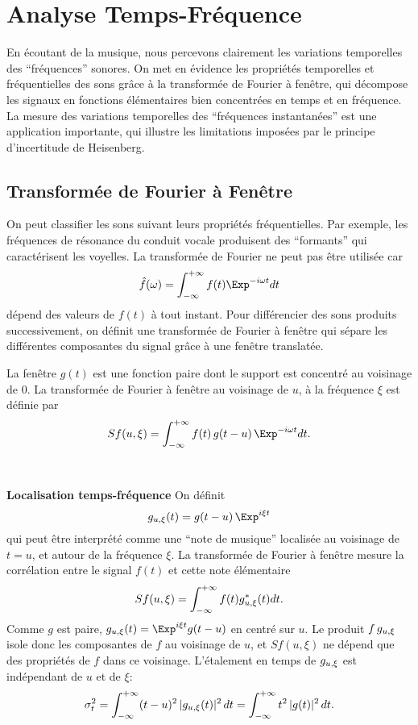 \chapter{Analyse Temps-Fr\'equence}
\label{chap-ana-temp-fre}

En \'{e}coutant de la musique, 
nous percevons clairement les variations temporelles
des ``fr\'{e}quences'' sonores. 
On met en \'{e}vidence les propri\'{e}t\'{e}s temporelles
et fr\'equentielles
des sons gr\^{a}ce \`{a} 
la transform\'{e}e de Fourier \`a fen\^etre,
qui d\'{e}compose les 
signaux en fonctions \'{e}l\'{e}mentaires bien concentr\'{e}es en 
temps et en fr\'{e}quence. La 
mesure des variations temporelles des
``fr\'{e}quences instantan\'{e}es'' est une application
importante, qui illustre les limitations impos\'ees par
le principe d'incertitude de Heisenberg.

\section{Transform\'ee de Fourier \`a Fen\^etre}
\label{temp-fre-se}

On peut classifier les sons suivant leurs propri\'et\'es 
fr\'equentielles. 
Par exemple, les fr\'equences de r\'esonance du conduit
vocale produisent des ``formants'' qui caract\'erisent les voyelles.
La transform\'ee de Fourier ne peut pas \^etre utilis\'ee car
\[
\hat f (\om) = \int_{-\infty}^{+\infty} f(t) \Exp^{-i\om t} dt
\]
d\'epend des valeurs de $f(t)$ \`a tout instant. Pour diff\'erencier
des sons produits successivement, on d\'efinit une  
transform\'ee de Fourier \`a fen\^etre qui 
s\'epare les diff\'erentes
composantes du signal gr\^ace \`a une fen\^etre translat\'ee.

La fen\^etre $g(t)$
est une fonction paire dont le support est concentr\'e au
voisinage de $0$. 
La transform\'ee de Fourier \`a fen\^etre
au voisinage de $u$, \`a la fr\'equence $\xi$ est d\'efinie par
\[
Sf(u,\xi) = \int_{-\infty}^{+\infty} f(t) \,g(t-u) \,\Exp^{-i\om t} dt .
\]
\\
\\
{\bf Localisation temps-fr\'equence}
On d\'efinit
\[
g_\uxi (t) = g(t-u) \,\Exp^{i\xi t}
\] 
qui peut \^etre interpr\'et\'e comme une ``note de musique''
localis\'ee au voisinage de $t =u$, et autour de 
la fr\'equence $\xi$.
La transform\'ee de Fourier \`a fen\^etre mesure la corr\'elation
entre le signal $f(t)$ et cette note \'el\'ementaire
\begin{equation}
\label{temp-fre-at}
Sf(u,\xi) = \int_{-\infty}^{+\infty} f(t) g_{u,\xi}^*(t) dt .
\end{equation}
Comme $g$ est paire, $g_{u,\xi} (t ) = \Exp^{i \xi t}	g(t-u)$ en 
centr\'{e} sur $u$. 
Le produit $f\, g_{u,\xi}$ isole donc les composantes de
$f$ au voisinage de $u$, et $Sf(u,\xi)$ ne d\'epend que
des propri\'et\'es de $f$ dans ce voisinage.
L'\'{e}talement en temps de $g_{u,\xi}$ est 
ind\'{e}pendant de $u$ et de $\xi$:
\begin{equation}
\label{sigma-t}
\sigma^2_t = \int_{-\infty}^{+\infty} (t-u) ^2 \,
|g_{u,\xi} (t)|^2\, dt = 
\int_{-\infty}^{+\infty} t ^2 \,|g(t)|^2\, dt .
\end{equation}

